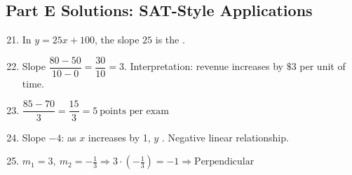 \documentclass[14pt]{extarticle}
\begin{document}
\subsection*{Part E Solutions: SAT-Style Applications}
\begin{enumerate}
    \setcounter{enumi}{20}
    \item In \(y=25x+100\), the slope \(25\) is the .
    \item Slope \(\dfrac{80-50}{10-0}=\dfrac{30}{10}=\boxed{3}\). Interpretation: revenue increases by \(\$3\) per unit of time.
    \item \(\dfrac{85-70}{3}=\dfrac{15}{3}=\boxed{5\ \text{points per exam}}\)
    \item Slope \(-4\): as \(x\) increases by 1, \(y\) . Negative linear relationship.
    \item \(m_1=3,\ m_2=-\tfrac{1}{3}\Rightarrow 3\cdot(-\tfrac{1}{3})=-1\Rightarrow\boxed{\text{Perpendicular}}\)
\end{enumerate}
\end{document}
